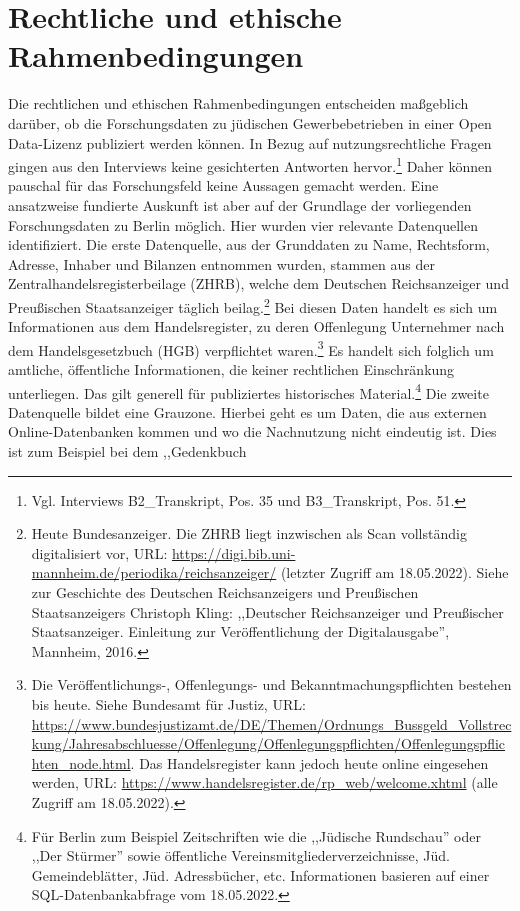 \section{Rechtliche und ethische Rahmenbedingungen}

Die rechtlichen und ethischen Rahmenbedingungen entscheiden maßgeblich darüber, ob die Forschungsdaten zu jüdischen Gewerbebetrieben in einer Open Data-Lizenz publiziert werden können. In Bezug auf nutzungsrechtliche Fragen gingen aus den Interviews keine gesichterten Antworten hervor.\footnote{Vgl. Interviews B2\_Transkript, Pos. 35 und B3\_Transkript, Pos. 51.} Daher können pauschal für das Forschungsfeld keine Aussagen gemacht werden. Eine ansatzweise fundierte Auskunft ist aber auf der Grundlage der vorliegenden Forschungsdaten zu Berlin möglich. Hier wurden vier relevante Datenquellen identifiziert. Die erste Datenquelle, aus der Grunddaten zu Name, Rechtsform, Adresse, Inhaber und Bilanzen entnommen wurden, stammen aus der Zentralhandelsregisterbeilage (ZHRB), welche dem Deutschen Reichsanzeiger und Preußischen Staatsanzeiger täglich beilag.\footnote{Heute Bundesanzeiger. Die ZHRB liegt inzwischen als Scan vollständig  digitalisiert vor, URL: \url{https://digi.bib.uni-mannheim.de/periodika/reichsanzeiger/} (letzter Zugriff am 18.05.2022). Siehe zur Geschichte des Deutschen Reichsanzeigers und Preußischen Staatsanzeigers Christoph Kling: ,,Deutscher Reichsanzeiger und Preußischer Staatsanzeiger. Einleitung zur Veröffentlichung der Digitalausgabe'', Mannheim, 2016.} Bei diesen Daten handelt es sich um Informationen aus dem Handelsregister, zu deren Offenlegung Unternehmer nach dem Handelsgesetzbuch (HGB) verpflichtet waren.\footnote{Die Veröffentlichungs-, Offenlegungs- und Bekanntmachungspflichten bestehen bis heute. Siehe Bundesamt für Justiz, URL: \url{https://www.bundesjustizamt.de/DE/Themen/Ordnungs_Bussgeld_Vollstreckung/Jahresabschluesse/Offenlegung/Offenlegungspflichten/Offenlegungspflichten_node.html}. Das Handelsregister kann jedoch heute online eingesehen werden, URL: \url{https://www.handelsregister.de/rp_web/welcome.xhtml} (alle Zugriff am 18.05.2022).} Es handelt sich folglich um amtliche, öffentliche Informationen, die keiner rechtlichen Einschränkung unterliegen. Das gilt generell für publiziertes historisches Material.\footnote{Für Berlin zum Beispiel Zeitschriften wie die ,,Jüdische Rundschau'' oder ,,Der Stürmer'' sowie öffentliche Vereinsmitgliederverzeichnisse, Jüd. Gemeindeblätter, Jüd. Adressbücher, etc. Informationen basieren auf einer SQL-Datenbankabfrage vom 18.05.2022.} Die zweite Datenquelle bildet eine Grauzone. Hierbei geht es um Daten, die aus externen Online-Datenbanken kommen und wo die Nachnutzung nicht eindeutig  ist. Dies ist zum Beispiel bei dem ,,Gedenkbuch
